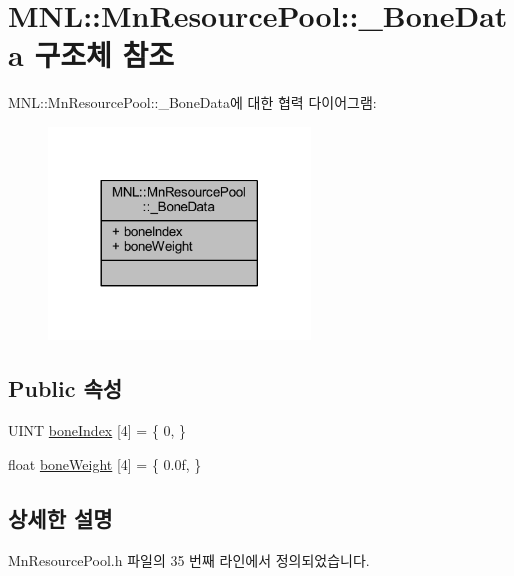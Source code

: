 \hypertarget{struct_m_n_l_1_1_mn_resource_pool_1_1___bone_data}{}\section{M\+NL\+:\+:Mn\+Resource\+Pool\+:\+:\+\_\+\+Bone\+Data 구조체 참조}
\label{struct_m_n_l_1_1_mn_resource_pool_1_1___bone_data}


M\+NL\+:\+:Mn\+Resource\+Pool\+:\+:\+\_\+\+Bone\+Data에 대한 협력 다이어그램\+:\nopagebreak
\begin{figure}[H]
\begin{center}
\leavevmode
\includegraphics[width=197pt]{struct_m_n_l_1_1_mn_resource_pool_1_1___bone_data__coll__graph}
\end{center}
\end{figure}
\subsection*{Public 속성}
\begin{DoxyCompactItemize}
\item 
U\+I\+NT \hyperlink{struct_m_n_l_1_1_mn_resource_pool_1_1___bone_data_a9b932ff393564d1bed51b6a061e5bf7e}{bone\+Index} \mbox{[}4\mbox{]} = \{ 0, \}
\item 
float \hyperlink{struct_m_n_l_1_1_mn_resource_pool_1_1___bone_data_a95848ae147b2eca3bfdbcebde21441f6}{bone\+Weight} \mbox{[}4\mbox{]} = \{ 0.\+0f, \}
\end{DoxyCompactItemize}


\subsection{상세한 설명}


Mn\+Resource\+Pool.\+h 파일의 35 번째 라인에서 정의되었습니다.




